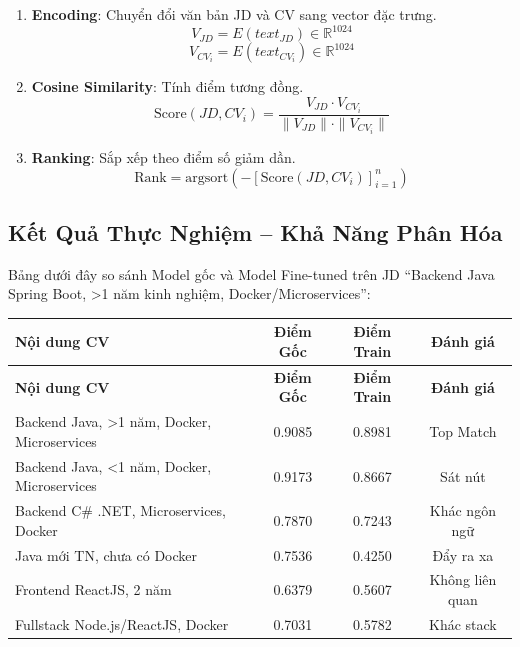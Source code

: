\documentclass[12pt, a4paper]{report}
\begin{document}
\begin{enumerate}
    \item \textbf{Encoding}: Chuyển đổi văn bản JD và CV sang vector đặc trưng.
    \begin{equation}
        V_{JD} = E(text_{JD}) \in \mathbb{R}^{1024}
    \end{equation}
    \begin{equation}
        V_{CV_i} = E(text_{CV_i}) \in \mathbb{R}^{1024}
    \end{equation}

    \item \textbf{Cosine Similarity}: Tính điểm tương đồng.
    \begin{equation}
        \text{Score}(JD, CV_i) = \frac{V_{JD} \cdot V_{CV_i}}{\|V_{JD}\| \cdot \|V_{CV_i}\|}
    \end{equation}

    \item \textbf{Ranking}: Sắp xếp theo điểm số giảm dần.
    \begin{equation}
        \text{Rank} = \text{argsort}\left(-[\text{Score}(JD, CV_i)]_{i=1}^{n}\right)
    \end{equation}
\end{enumerate}

\subsection{Kết Quả Thực Nghiệm -- Khả Năng Phân Hóa}

Bảng dưới đây so sánh Model gốc và Model Fine-tuned trên JD ``Backend Java Spring Boot, >1 năm kinh nghiệm, Docker/Microservices'':

\begin{longtable}{|p{5.5cm}|c|c|c|}
\hline
\textbf{Nội dung CV} & \textbf{Điểm Gốc} & \textbf{Điểm Train} & \textbf{Đánh giá} \\
\hline
\endfirsthead
\hline
\textbf{Nội dung CV} & \textbf{Điểm Gốc} & \textbf{Điểm Train} & \textbf{Đánh giá} \\
\hline
\endhead
Backend Java, >1 năm, Docker, Microservices & 0.9085 & 0.8981 & Top Match \\
\hline
Backend Java, <1 năm, Docker, Microservices & 0.9173 & 0.8667 & Sát nút \\
\hline
Backend C\# .NET, Microservices, Docker & 0.7870 & 0.7243 & Khác ngôn ngữ \\
\hline
Java mới TN, chưa có Docker & 0.7536 & 0.4250 & Đẩy ra xa \\
\hline
Frontend ReactJS, 2 năm & 0.6379 & 0.5607 & Không liên quan \\
\hline
Fullstack Node.js/ReactJS, Docker & 0.7031 & 0.5782 & Khác stack \\
\hline
\end{longtable}
\end{document}
